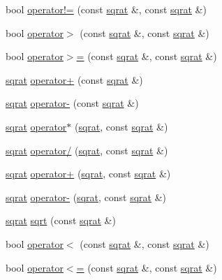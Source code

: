\begin{DoxyCompactItemize}
\item 
bool \mbox{\hyperlink{classsqrat_ae100dba56606c0cfbbe45c04ae9f462a}{operator!=}} (const \mbox{\hyperlink{classsqrat}{sqrat}} \&, const \mbox{\hyperlink{classsqrat}{sqrat}} \&)
\item 
bool \mbox{\hyperlink{classsqrat_a0a9ebc0afb8356e073d69a69d1450a65}{operator$>$}} (const \mbox{\hyperlink{classsqrat}{sqrat}} \&, const \mbox{\hyperlink{classsqrat}{sqrat}} \&)
\item 
bool \mbox{\hyperlink{classsqrat_adac0450048dc40c698aa22f334e280a1}{operator$>$=}} (const \mbox{\hyperlink{classsqrat}{sqrat}} \&, const \mbox{\hyperlink{classsqrat}{sqrat}} \&)
\item 
\mbox{\hyperlink{classsqrat}{sqrat}} \mbox{\hyperlink{classsqrat_a5a4ae2683cd1f23c81c09229d1dcc34a}{operator+}} (const \mbox{\hyperlink{classsqrat}{sqrat}} \&)
\item 
\mbox{\hyperlink{classsqrat}{sqrat}} \mbox{\hyperlink{classsqrat_ade89f3d4e5e8de405db9e23a1420d332}{operator-\/}} (const \mbox{\hyperlink{classsqrat}{sqrat}} \&)
\item 
\mbox{\hyperlink{classsqrat}{sqrat}} \mbox{\hyperlink{classsqrat_a0f75e7f8b43c76214b0845eadbfbfe6b}{operator$\ast$}} (\mbox{\hyperlink{classsqrat}{sqrat}}, const \mbox{\hyperlink{classsqrat}{sqrat}} \&)
\item 
\mbox{\hyperlink{classsqrat}{sqrat}} \mbox{\hyperlink{classsqrat_aa6e76248a9ec776743e60e5db8b3cb6d}{operator/}} (\mbox{\hyperlink{classsqrat}{sqrat}}, const \mbox{\hyperlink{classsqrat}{sqrat}} \&)
\item 
\mbox{\hyperlink{classsqrat}{sqrat}} \mbox{\hyperlink{classsqrat_a714592d215fdb454264df3d7bfbe0b5e}{operator+}} (\mbox{\hyperlink{classsqrat}{sqrat}}, const \mbox{\hyperlink{classsqrat}{sqrat}} \&)
\item 
\mbox{\hyperlink{classsqrat}{sqrat}} \mbox{\hyperlink{classsqrat_a78bb0ea9bd5a4282ba33a61c4bc073b6}{operator-\/}} (\mbox{\hyperlink{classsqrat}{sqrat}}, const \mbox{\hyperlink{classsqrat}{sqrat}} \&)
\item 
\mbox{\hyperlink{classsqrat}{sqrat}} \mbox{\hyperlink{classsqrat_aac93909598aa6f1b1b6bbe035a1af815}{sqrt}} (const \mbox{\hyperlink{classsqrat}{sqrat}} \&)
\item 
bool \mbox{\hyperlink{classsqrat_a1326bc7564a14f2fa4cbe59cdcf94b69}{operator$<$}} (const \mbox{\hyperlink{classsqrat}{sqrat}} \&, const \mbox{\hyperlink{classsqrat}{sqrat}} \&)
\item 
bool \mbox{\hyperlink{classsqrat_ae33aee8490a3137fb967fbd52b100f6d}{operator$<$=}} (const \mbox{\hyperlink{classsqrat}{sqrat}} \&, const \mbox{\hyperlink{classsqrat}{sqrat}} \&)

\end{DoxyCompactItemize}
